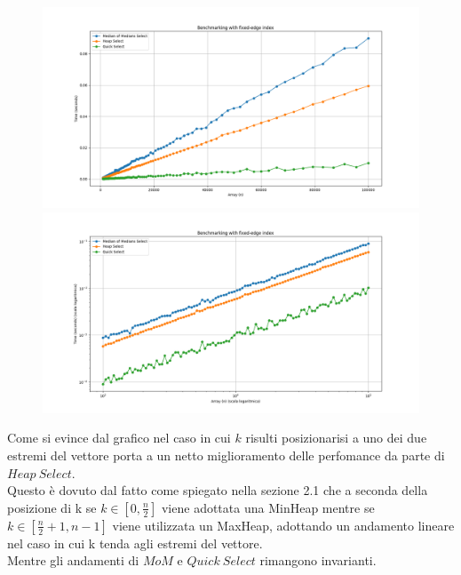 \documentclass[a4paper]{article}
\begin{document}
\begin{figure}[h]
            \centering
            \includegraphics[width=.83\textwidth]{graphs/k_last_n.png}
            \includegraphics[width=.83\textwidth]{graphs/k_last_2xlog.png}
\end{figure}
Come si evince dal grafico nel caso in cui $k$ risulti posizionarisi a uno dei due estremi del vettore porta a un netto miglioramento delle perfomance da parte di $Heap\ Select$.\\
Questo è dovuto dal fatto come spiegato nella sezione 2.1 che a seconda della posizione di k se $k\in[0,\frac{n}{2}]$ viene adottata una MinHeap mentre se $k\in[\frac{n}{2}+1,n-1]$ viene utilizzata un MaxHeap, adottando un andamento lineare nel caso in cui k tenda agli estremi del vettore.\\
Mentre gli andamenti di $MoM$ e $Quick\ Select$ rimangono invarianti.\\
\newpage
\end{document}
